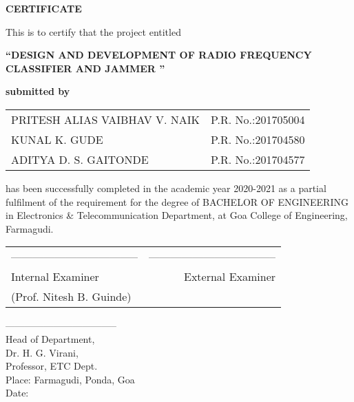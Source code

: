 \begin{center}
\begin{Huge}
{\bfseries CERTIFICATE}\\
\end{Huge}
\vspace{1cm}
{\normalsize This is to certify that the project entitled}\\
\vspace{0.3cm}
\begin{large}
{\bfseries ``DESIGN AND DEVELOPMENT OF RADIO FREQUENCY CLASSIFIER AND JAMMER ''}\\
\end{large}
\vspace{0.3cm}
{\bfseries submitted by}\\
\vspace{0.8cm}
\begin{table}[H]
\normalsize
\bfseries
\begin{center}
\begin{tabular}{ll}
PRITESH ALIAS VAIBHAV V. NAIK \hspace{1cm} & P.R. No.:201705004\\
KUNAL K. GUDE & P.R. No.:201704580\\
ADITYA D. S. GAITONDE & P.R. No.:201704577\\
\end{tabular}
\end{center}
\end{table}
\end{center}
\noindent has been successfully completed in the academic year 2020-2021 as a partial fulfilment of the requirement for the degree of BACHELOR OF ENGINEERING in Electronics \& Telecommunication Department, at Goa College of Engineering, Farmagudi.\\
\vspace{1.3cm}
\begin{table}[H]
\begin{tabular}{lr}
\noindent ----------------------------------- & \hspace{6cm} ----------------------------------- \\
Internal Examiner & External Examiner\\
(Prof. Nitesh B. Guinde)&\\
\end{tabular}
\end{table}
\noindent -----------------------------------\\
Head of Department,\\
Dr. H. G. Virani,\\
Professor, ETC Dept.\\

\vspace{0.9cm}
\noindent Place: Farmagudi, Ponda, Goa\\
\noindent Date: 

